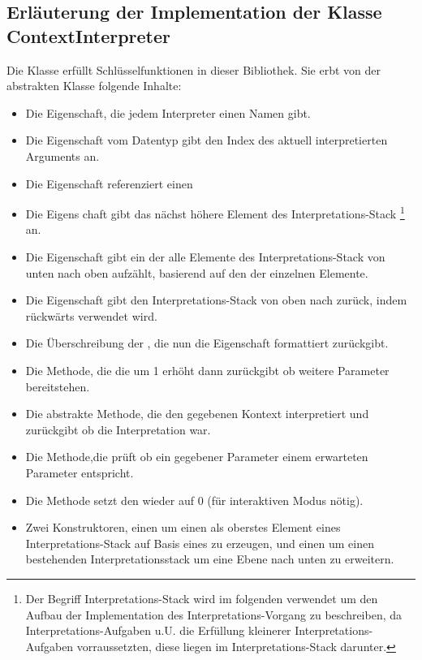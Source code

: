 \subsection{Erläuterung der Implementation der Klasse ContextInterpreter}\label{subsec:ContextInterpreter}
Die Klasse  erfüllt Schlüsselfunktionen in dieser Bibliothek.
Sie erbt von der abstrakten  Klasse folgende Inhalte:
\begin{itemize}
 \item Die  Eigenschaft, die jedem Interpreter einen Namen gibt.
 \item Die  Eigenschaft vom Datentyp  gibt den Index des aktuell interpretierten Arguments an.
 \item Die  Eigenschaft referenziert einen 
 \item Die  Eigens chaft gibt das nächst höhere Element des Interpretations-Stack
 \footnote{Der Begriff Interpretations-Stack wird im folgenden verwendet um den Aufbau der Implementation des Interpretations-Vorgang zu beschreiben, da Interpretations-Aufgaben u.U. die Erfüllung kleinerer Interpretations-Aufgaben vorraussetzten, diese liegen im Interpretations-Stack darunter.}
 an.%
 \item Die  Eigenschaft gibt ein  der alle Elemente des Interpretations-Stack von unten nach oben aufzählt, basierend auf den  der einzelnen Elemente.
 \item Die  Eigenschaft gibt den Interpretations-Stack von oben nach zurück, indem  rückwärts verwendet wird.
 \item Die Überschreibung der , die nun die  Eigenschaft formattiert zurückgibt.
 \item Die  Methode, die die  um 1 erhöht dann zurückgibt ob weitere Parameter bereitstehen.
 \item Die abstrakte  Methode, die den gegebenen Kontext interpretiert und zurückgibt ob die Interpretation war.
 \item Die  Methode,die prüft ob ein gegebener Parameter einem erwarteten Parameter entspricht.
 \item Die  Methode setzt den  wieder auf 0 (für interaktiven Modus nötig).
 \item Zwei Konstruktoren, einen um einen  als oberstes Element eines Interpretations-Stack auf Basis eines  zu erzeugen, und einen um einen bestehenden Interpretationsstack um eine Ebene nach unten zu erweitern.
\end{itemize}

